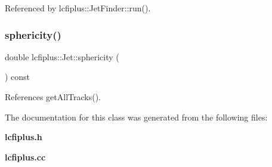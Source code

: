 Referenced by lcfiplus\+::\+Jet\+Finder\+::run().

\mbox{\label{classlcfiplus_1_1Jet_ad430bdf3ea208e5d5c21e178169073eb}} 
\subsubsection{sphericity()}
{\footnotesize\ttfamily double lcfiplus\+::\+Jet\+::sphericity (\begin{DoxyParamCaption}{ }\end{DoxyParamCaption}) const}



References get\+All\+Tracks().



The documentation for this class was generated from the following files\+:\begin{DoxyCompactItemize}
\item 
\textbf{ lcfiplus.\+h}\item 
\textbf{ lcfiplus.\+cc}\end{DoxyCompactItemize}
